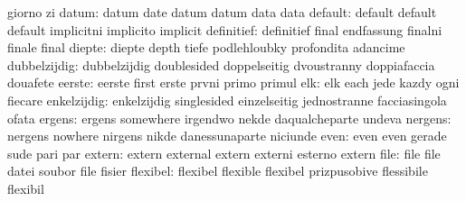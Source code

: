                            giorno                    zi
                    datum: datum                     date
                           datum                     datum
                           data                      data
                  default: default                   default
                           default                   implicitni
                           implicito                 implicit
               definitief: definitief                final
                           endfassung                finalni
                           finale                    final
                   diepte: diepte                    depth
                           tiefe                     podlehloubky
                           profondita                adancime
             dubbelzijdig: dubbelzijdig              doublesided
                           doppelseitig              dvoustranny
                           doppiafaccia              douafete
                   eerste: eerste                    first
                           erste                     prvni
                           primo                     primul
                      elk: elk                       each
                           jede                      kazdy
                           ogni                      fiecare
              enkelzijdig: enkelzijdig               singlesided
                           einzelseitig              jednostranne
                           facciasingola             ofata
                   ergens: ergens                    somewhere
                           irgendwo                  nekde
                           daqualcheparte            undeva
                  nergens: nergens                   nowhere
                           nirgens                   nikde
                           danessunaparte            niciunde
                     even: even                      even
                           gerade                    sude
                           pari                      par
                   extern: extern                    external
                           extern                    externi
                           esterno                   extern
                     file: file                      file
                           datei                     soubor
                           file                      fisier
                 flexibel: flexibel                  flexible
                           flexibel                  prizpusobive
                           flessibile                flexibil
